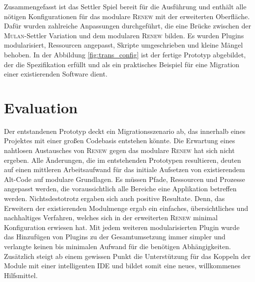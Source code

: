 	Zusammengefasst ist das Settler Spiel bereit für die Ausführung und enthält alle nötigen Konfigurationen für das modulare \textsc{Renew} mit der erweiterten Oberfläche. Dafür wurden zahlreiche Anpassungen durchgeführt, die eine Brücke zwischen der \textsc{Mulan}-Settler Variation und dem modularen \textsc{Renew} bilden. Es wurden Plugins modularisiert, Ressourcen angepasst, Skripte umgeschrieben und kleine Mängel behoben. \newline
	In der Abbildung \ref{fig:trans_config} ist der fertige Prototyp abgebildet, der die Spezifikation erfüllt und als ein praktisches Beispiel für eine Migration einer existierenden Software dient. 

\section{Evaluation}
	Der entstandenen Prototyp deckt ein Migrationsszenario ab, das innerhalb eines Projektes mit einer großen Codebasis entstehen könnte. Die Erwartung eines nahtlosen Austausches von \textsc{Renew} gegen das modulare \textsc{Renew} hat sich nicht ergeben. Alle Änderungen, die im entstehenden Prototypen resultieren, deuten auf einen mittleren Arbeitsaufwand für das initiale Aufsetzen von existierendem Alt-Code auf modulare Grundlagen. Es müssen Pfade, Ressourcen und Prozesse angepasst werden, die voraussichtlich alle Bereiche eine Applikation betreffen werden.\newline
	Nichtsdestotrotz ergaben sich auch positive Resultate. Denn, das Erweitern der existierenden Modulmenge ergab ein einfaches, übersichtliches und nachhaltiges Verfahren, welches sich in der erweiterten \textsc{Renew} minimal Konfiguration erwiesen hat. Mit jedem weiteren modularisierten Plugin wurde das Hinzufügen von Plugins zu der Gesamtumsetzung immer simpler und verlangte keinen bis minimalen Aufwand für die benötigen Abhängigkeiten. Zusätzlich steigt ab einem gewissen Punkt die Unterstützung für das Koppeln der Module mit einer intelligenten IDE und bildet somit eine neues, willkommenes Hilfsmittel.
